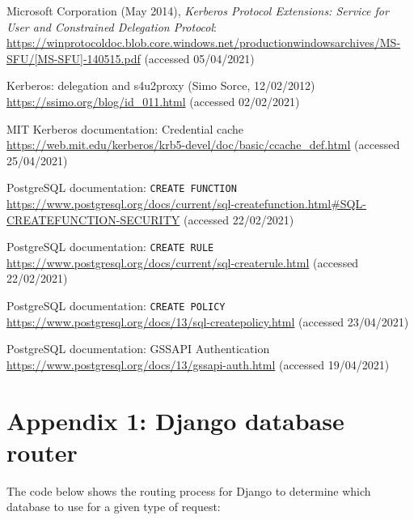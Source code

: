 \documentclass{article}
\begin{document}
\begin{thebibliography}{9}
 Microsoft Corporation (May 2014), \textit{Kerberos Protocol Extensions: Service for User and Constrained Delegation Protocol}: \url{https://winprotocoldoc.blob.core.windows.net/productionwindowsarchives/MS-SFU/[MS-SFU]-140515.pdf} (accessed 05/04/2021)

 Kerberos: delegation and s4u2proxy (Simo Sorce, 12/02/2012) \url{https://ssimo.org/blog/id_011.html} (accessed 02/02/2021)

 MIT Kerberos documentation: Credential cache \url{https://web.mit.edu/kerberos/krb5-devel/doc/basic/ccache_def.html} (accessed 25/04/2021)

 PostgreSQL documentation: \texttt{CREATE FUNCTION} \url{https://www.postgresql.org/docs/current/sql-createfunction.html#SQL-CREATEFUNCTION-SECURITY} (accessed 22/02/2021)

 PostgreSQL documentation: \texttt{CREATE RULE} \url{https://www.postgresql.org/docs/current/sql-createrule.html} (accessed 22/02/2021)

 PostgreSQL documentation: \texttt{CREATE POLICY} \url{https://www.postgresql.org/docs/13/sql-createpolicy.html} (accessed 23/04/2021)

 PostgreSQL documentation: GSSAPI Authentication \url{https://www.postgresql.org/docs/13/gssapi-auth.html} (accessed 19/04/2021)
\end{thebibliography}

\section*{Appendix 1: Django database router}
\label{sec:appendix1}
The code below shows the routing process for Django to determine which database to use for a given type of request:
\end{document}
